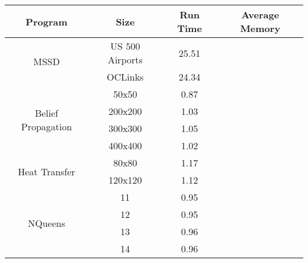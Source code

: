 \begin{tabular}{c | c || c | c} \hline
	\textbf{Program} & \textbf{Size} & \textbf{Run Time} & \textbf{Average Memory}\\ \hline \hline
	\multirow{2}{*}{MSSD}  & US 500 Airports &  25.51  &    \\
		 & OCLinks &  24.34  &    \\
	\hline
	\multirow{4}{*}{Belief Propagation}  & 50x50 &  0.87  &    \\
		 & 200x200 &  1.03  &    \\
		 & 300x300 &  1.05  &    \\
		 & 400x400 &  1.02  &    \\
	\hline
	\multirow{2}{*}{Heat Transfer}  & 80x80 &  1.17  &    \\
		 & 120x120 &  1.12  &    \\
	\hline
	\multirow{4}{*}{NQueens}  & 11 &  0.95  &    \\
		 & 12 &  0.95  &    \\
		 & 13 &  0.96  &    \\
		 & 14 &  0.96  &    \\
	\hline
\end{tabular}
